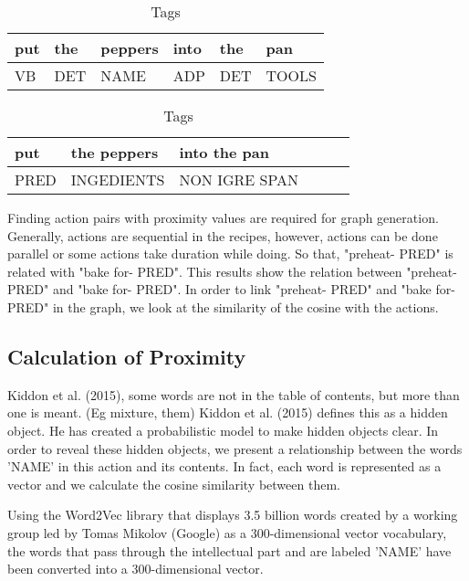  \begin{table}[]
\centering
\caption{Tags}
\label{my-label}
\begin{tabular}{|l|l|l|l|l|l|}
\hline
put    & the     &  peppers  & into  & the    & pan \\ \hline
VB    & DET   & NAME     & ADP & DET & TOOLS      \\ \hline
\end{tabular}
\end{table}

 \begin{table}[]
\centering
\caption{Tags}
\label{my-label}
\begin{tabular}{|l|l|l|l|l|l|}
\hline
put       &  the peppers       & into  the pan \\ \hline
PRED  & INGEDIENTS & NON IGRE SPAN  \\ \hline
\end{tabular}
\end{table}

Finding action pairs with proximity values are required for graph generation. Generally, actions are sequential in the recipes, however, actions can be done  parallel or some actions take duration while doing. So that, "preheat- PRED" is related with "bake for- PRED". This results show the relation between "preheat- PRED" and "bake for- PRED". In order to link "preheat- PRED"  and  "bake for- PRED" in the graph,  we look at the similarity of the cosine with the actions. 




\subsection{Calculation of Proximity}
Kiddon et al. (2015), some words are not in the table of contents, but more than one is meant. (Eg mixture, them) Kiddon et al. (2015) defines this as a hidden object. He has created a probabilistic model to make hidden objects clear. In order to reveal these hidden objects, we present a relationship between the words 'NAME' in this action and its contents. In fact, each word is represented as a vector and we calculate the cosine similarity between them.

Using the Word2Vec library that displays 3.5 billion words created by a working group led by Tomas Mikolov (Google) as a 300-dimensional vector vocabulary, the words that pass through the intellectual part and are labeled 'NAME' have been converted into a 300-dimensional vector.

